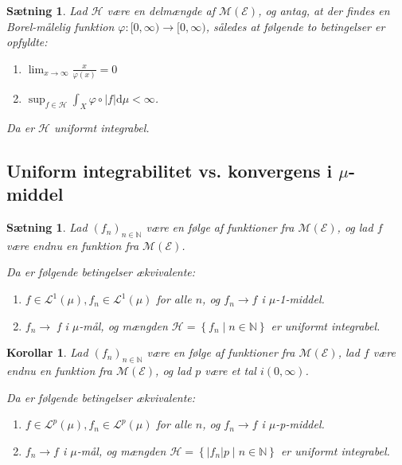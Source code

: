\documentclass{article}
\newcommand{\1}{\mathbbm{1}}
\theoremstyle{boxed}
\newtheorem{corollary}[theorem]{Korollar}
\newtheorem{proposition}[theorem]{Sætning}
\begin{document}
\begin{theorem-box}
    \begin{proposition}
        Lad $\mathcal{H}$ være en delmængde af $\mathcal{M}(\mathcal{E})$, og antag, at der findes en Borel-målelig funktion $\varphi:[0, \infty) \rightarrow[0, \infty)$, således at følgende to betingelser er opfyldte:
        \begin{enumerate}
            \item[\textnormal{(i)}] $\lim _{x \rightarrow \infty} \frac{x}{\varphi(x)}=0$
            \item[\textnormal{(ii)}] $\sup _{f \in \mathcal{H}} \int_X \varphi \circ|f| \mathrm{d} \mu<\infty$.
        \end{enumerate}
Da er $\mathcal{H}$ uniformt integrabel.
    \end{proposition}
\end{theorem-box}
\subsection{Uniform integrabilitet vs. konvergens i $\mu$-middel}
\begin{theorem-box}
    \begin{proposition}
        Lad $\left(f_n\right)_{n \in \mathbb{N}}$ være en følge af funktioner fra $\mathcal{M}(\mathcal{E})$, og lad $f$ være endnu en funktion fra $\mathcal{M}(\mathcal{E})$.

Da er følgende betingelser ækvivalente:
\begin{enumerate}
    \item[\textnormal{(i)}] $f \in \mathcal{L}^1(\mu), f_n \in \mathcal{L}^1(\mu)$ for alle $n$, og $f_n \rightarrow f$ i $\mu$-1-middel.
    \item[\textnormal{(ii)}] $f_n \rightarrow$ f i $\mu$-mål, og mængden $\mathcal{H}=\left\{f_n \mid n \in \mathbb{N}\right\}$ er uniformt integrabel.
\end{enumerate}
    \end{proposition}
\end{theorem-box}
\begin{theorem-box}
    \begin{corollary}
        Lad $\left(f_n\right)_{n \in \mathbb{N}}$ være en følge af funktioner fra $\mathcal{M}(\mathcal{E})$, lad $f$ være endnu en funktion fra $\mathcal{M}(\mathcal{E})$, og lad $p$ være et tal $i(0, \infty)$.

Da er følgende betingelser ækvivalente:
\begin{enumerate}
    \item[\textnormal{(i$_p$)}] $f \in \mathcal{L}^p(\mu), f_n \in \mathcal{L}^p(\mu)$ for alle $n$, og $f_n \rightarrow f$ i $\mu$-p-middel.
    \item[\textnormal{(ii$_p$)}] $f_n \rightarrow f$ i $\mu$-mål, og mængden $\mathcal{H}=\left\{\left|f_n\right| p \mid n \in \mathbb{N}\right\}$ er uniformt integrabel.
\end{enumerate}
    \end{corollary}
\end{theorem-box}
\end{document}
